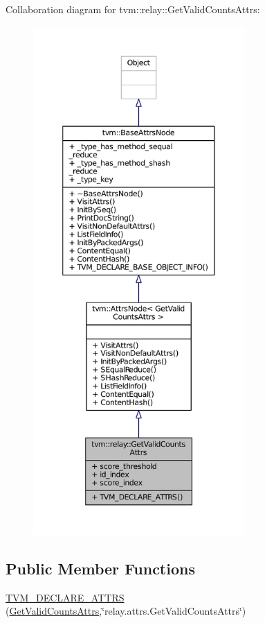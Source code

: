 Collaboration diagram for tvm\+:\+:relay\+:\+:Get\+Valid\+Counts\+Attrs\+:
\nopagebreak
\begin{figure}[H]
\begin{center}
\leavevmode
\includegraphics[height=550pt]{structtvm_1_1relay_1_1GetValidCountsAttrs__coll__graph}
\end{center}
\end{figure}
\subsection*{Public Member Functions}
\begin{DoxyCompactItemize}
\item 
\hyperlink{structtvm_1_1relay_1_1GetValidCountsAttrs_aa88b0715787f9214ceae0428dfc56a59}{T\+V\+M\+\_\+\+D\+E\+C\+L\+A\+R\+E\+\_\+\+A\+T\+T\+RS} (\hyperlink{structtvm_1_1relay_1_1GetValidCountsAttrs}{Get\+Valid\+Counts\+Attrs},\char`\"{}relay.\+attrs.\+Get\+Valid\+Counts\+Attrs\char`\"{})
\end{DoxyCompactItemize}
